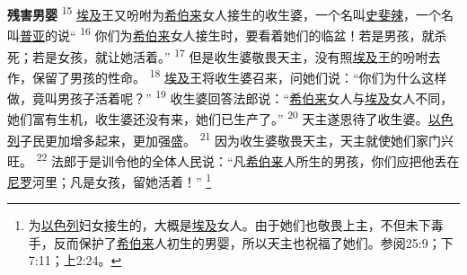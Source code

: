 \begin{multicols}{2}
\textbf{残害男婴\quad}
\textsuperscript{15}
\uline{埃及}王又吩咐为\uline{希伯来}女人接生的收生婆，一个名叫\uline{史斐辣}，一个名叫\uline{普亚}的说“
\textsuperscript{16}
你们为\uline{希伯来}女人接生时，要看着她们的临盆！若是男孩，就杀死；若是女孩，就让她活着。”
\textsuperscript{17}
但是收生婆敬畏天主，没有照\uline{埃及}王的吩咐去作，保留了男孩的性命。
\textsuperscript{18}
\uline{埃及}王将收生婆召来，问她们说：“你们为什么这样做，竟叫男孩子活着呢？”
\textsuperscript{19}
收生婆回答法郎说：“\uline{希伯来}女人与\uline{埃及}女人不同，她们富有生机，收生婆还没有来，她们已生产了。”
\textsuperscript{20}
天主遂恩待了收生婆。\uline{以色列}子民更加增多起来，更加强盛。
\textsuperscript{21}
因为收生婆敬畏天主，天主就使她们家门兴旺。
\textsuperscript{22}
法郎于是训令他的全体人民说：“凡\uline{希伯来}人所生的男孩，你们应把他丢在\uline{尼罗}河里；凡是女孩，留她活着！”
\footnote{为\uline{以色列}妇女接生的，大概是\uline{埃及}女人。由于她们也敬畏上主，不但未下毒手，反而保护了\uline{希伯来}人初生的男婴，所以天主也祝福了她们。参阅25:9；下7:11；上2:24。}

\end{multicols}